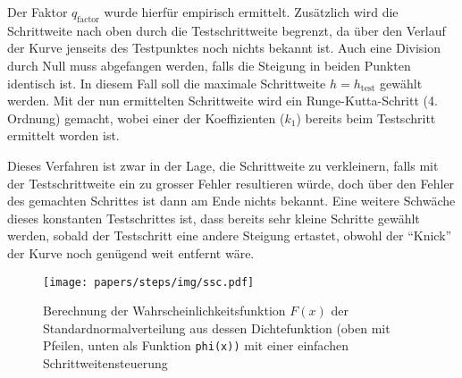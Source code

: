 %
Der Faktor $q_\text{factor}$ wurde hierfür empirisch ermittelt.
Zusätzlich wird die Schrittweite nach oben durch die Testschrittweite begrenzt,
da über den Verlauf der Kurve jenseits des Testpunktes noch nichts bekannt ist.
Auch eine Division durch Null muss abgefangen werden, falls die Steigung in beiden Punkten identisch ist.
In diesem Fall soll die maximale Schrittweite $h=h_{\text{test}}$ gewählt werden.
Mit der nun ermittelten Schrittweite wird ein Runge-Kutta-Schritt (4. Ordnung) gemacht,
wobei einer der Koeffizienten ($k_1$) bereits beim Testschritt ermittelt worden ist.

Dieses Verfahren ist zwar in der Lage, die Schrittweite zu verkleinern, falls mit der Testschrittweite ein zu grosser Fehler resultieren würde,
doch über den Fehler des gemachten Schrittes ist dann am Ende nichts bekannt.
Eine weitere Schwäche dieses konstanten Testschrittes ist, dass bereits sehr kleine Schritte gewählt werden,
sobald der Testschritt eine andere Steigung ertastet, obwohl der ``Knick'' der Kurve noch genügend weit entfernt wäre.

\begin{figure}
  \centering
  \texttt{[image: papers/steps/img/ssc.pdf]}
  \caption{Berechnung der Wahrscheinlichkeitsfunktion $F(x)$ der Standardnormalverteilung aus dessen Dichtefunktion
    (oben mit Pfeilen, unten als Funktion \texttt{phi(x))} mit einer einfachen Schrittweitensteuerung
    \label{buch:steps:examplessc}}
\end{figure}

